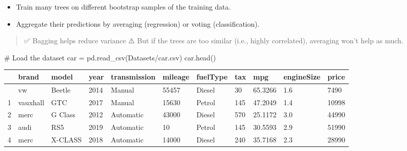 \documentclass[
  letterpaper,
  DIV=11,
  numbers=noendperiod]{scrreprt}
\newenvironment{Shaded}{\begin{snugshade}}{\end{snugshade}}
\newcommand{\CommentTok}[1]{\textcolor[rgb]{0.37,0.37,0.37}{#1}}
\newcommand{\NormalTok}[1]{\textcolor[rgb]{0.00,0.23,0.31}{#1}}
\newcommand{\OperatorTok}[1]{\textcolor[rgb]{0.37,0.37,0.37}{#1}}
\newcommand{\StringTok}[1]{\textcolor[rgb]{0.13,0.47,0.30}{#1}}
\begin{document}
\begin{itemize}
\item
  Train many trees on different bootstrap samples of the training data.
\item
  Aggregate their predictions by averaging (regression) or voting
  (classification).
\end{itemize}

\begin{quote}
✅ Bagging helps reduce variance ⚠️ But if the trees are too similar
(i.e., highly correlated), averaging won't help as much.
\end{quote}

\begin{Shaded}
\begin{Highlighting}[]
\CommentTok{\# Load the dataset}
\NormalTok{car }\OperatorTok{=}\NormalTok{ pd.read\_csv(}\StringTok{\textquotesingle{}Datasets/car.csv\textquotesingle{}}\NormalTok{)}
\NormalTok{car.head()}
\end{Highlighting}
\end{Shaded}

\begin{longtable}[]{@{}lllllllllll@{}}
\toprule\noalign{}
& brand & model & year & transmission & mileage & fuelType & tax & mpg &
engineSize & price \\
\midrule\noalign{}
\endhead
\bottomrule\noalign{}
\endlastfoot
0 & vw & Beetle & 2014 & Manual & 55457 & Diesel & 30 & 65.3266 & 1.6 &
7490 \\
1 & vauxhall & GTC & 2017 & Manual & 15630 & Petrol & 145 & 47.2049 &
1.4 & 10998 \\
2 & merc & G Class & 2012 & Automatic & 43000 & Diesel & 570 & 25.1172 &
3.0 & 44990 \\
3 & audi & RS5 & 2019 & Automatic & 10 & Petrol & 145 & 30.5593 & 2.9 &
51990 \\
4 & merc & X-CLASS & 2018 & Automatic & 14000 & Diesel & 240 & 35.7168 &
2.3 & 28990 \\
\end{longtable}
\end{document}
